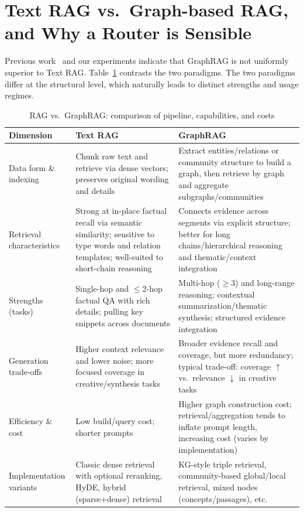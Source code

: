 \documentclass{article}
\theoremstyle{plain}
\theoremstyle{definition}
\theoremstyle{remark}
\begin{document}
\section{Text RAG vs.\ Graph-based RAG, and Why a Router is Sensible} \label{DD}

Previous work~\citep{han2025rag, zhou2025depth} and our experiments indicate that GraphRAG is not uniformly superior to Text RAG. Table~\ref{tab:rag-vs-graphrag} contrasts the two paradigms. The two paradigms differ at the structural level, which naturally leads to distinct strengths and usage regimes.

\begin{table}[htb]
\centering
\caption{RAG vs.\ GraphRAG: comparison of pipeline, capabilities, and costs}
\label{tab:rag-vs-graphrag}
\begin{tabularx}{\linewidth}{@{}p{3.1cm} X X@{}}
\toprule
\textbf{Dimension} & \textbf{Text RAG} & \textbf{GraphRAG} \\
\midrule
Data form \& indexing & Chunk raw text and retrieve via dense vectors; preserves original wording and details & Extract entities/relations or community structure to build a graph, then retrieve by graph and aggregate subgraphs/communities \\
Retrieval characteristics & Strong at in-place factual recall via semantic similarity; sensitive to type words and relation templates; well-suited to short-chain reasoning & Connects evidence across segments via explicit structure; better for long chains/hierarchical reasoning and thematic/context integration \\
Strengths (tasks) & Single-hop and $\le$2-hop factual QA with rich details; pulling key snippets across documents & Multi-hop ($\ge$3) and long-range reasoning; contextual summarization/thematic synthesis; structured evidence integration \\
Generation trade-offs & Higher context relevance and lower noise; more focused coverage in creative/synthesis tasks & Broader evidence recall and coverage, but more redundancy; typical trade-off: coverage $\uparrow$ vs.\ relevance $\downarrow$ in creative tasks \\
Efficiency \& cost & Low build/query cost; shorter prompts & Higher graph construction cost; retrieval/aggregation tends to inflate prompt length, increasing cost (varies by implementation) \\
Implementation variants & Classic dense retrieval with optional reranking, HyDE, hybrid (sparse+dense) retrieval & KG-style triple retrieval, community-based global/local retrieval, mixed nodes (concepts/passages), etc. \\

\end{tabularx}
\end{table}
\end{document}
